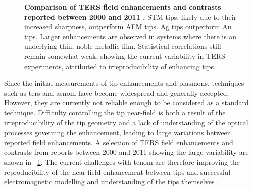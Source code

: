 \documentclass{article}
\begin{document}
\begin{figure}
\centering
{}
{\caption[Comparison of TERS field enhancements and contrasts reported between 2000 and 2011 \cite{pettinger2012}]{\textbf{Comparison of TERS field enhancements and contrasts reported between 2000 and 2011 \cite{pettinger2012}.} STM tips, likely due to their increased sharpness, outperform AFM tips. Ag tips outperform Au tips. Larger enhancements are observed in systems where there is an underlying thin, noble metallic film. Statistical correlations still remain somewhat weak, showing the current variability in TERS experiments, attributed to irreproducibility of enhancing tips.}
\label{fig:pettinger2012}}
\end{figure}

Since the initial measurements of tip enhancements and plasmons, techniques such as \gls{ters} and \gls{asnom} have become widespread and generally accepted. However, they are currently not reliable enough to be considered as a standard technique. Difficulty controlling the tip near-field is both a result of the irreproducibility of the tip geometry and a lack of understanding of the optical processes governing the enhancement, leading to large variations between reported field enhancements. A selection of TERS field enhancements and contrasts from reports between 2000 and 2011 showing the large variability are shown in \figurename~\ref{fig:pettinger2012}. The current challenges with \gls{tenom} are therefore improving the reproducibility of the near-field enhancement between tips \cite{blum2014, kumar2014, mino2014} and successful electromagnetic modelling and understanding of the tips themselves \cite{}.
\end{document}
